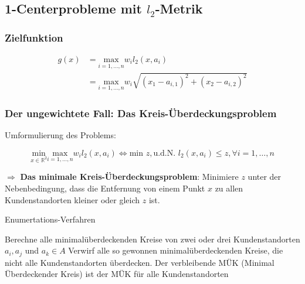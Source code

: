 
    \subsection{1-Centerprobleme mit $l_2$-Metrik} %
    \label{sub:1_centerprobleme_mit_l_2_metrik}

      \begin{exmp}
        {\color{blue}{Aufgabe 10}}
      \end{exmp}
      \subsubsection{Zielfunktion} %
      \label{ssub:zielfunktion}
        \begin{equation}
          \begin{aligned}
            g(x) &= \underset{i = 1,\dots, n}{\text{max}}w_il_2(x,a_i) \\
                 &= \underset{i = 1,\dots, n}{\text{max}}w_i\sqrt{(x_1 - a_{i, 1})^2 + (x_2 - a_{i,2})^2}
          \end{aligned}
        \end{equation}

      \subsubsection{Der ungewichtete Fall: Das Kreis-Überdeckungsproblem} %
      \label{ssub:der_ungewichtete_fall_das_kreis_überdeckungsproblem}
        \par Umformulierung des Problems:

        \[
          \underset{x \in \mathbb{R}^2}{\text{min}} \underset{i = 1,\dots, n}{\text{max}}w_il_2(x,a_i) \Leftrightarrow \text{min } z, \text{u.d.N. } l_2(x, a_i) \leq z, \forall i = 1, \dots, n
        \]

        \par $\Rightarrow$ \textbf{Das minimale Kreis-Überdeckungsproblem}: Minimiere $z$ unter der Nebenbedingung, dass die Entfernung von einem Punkt $x$ zu allen Kundenstandorten kleiner oder gleich $z$ ist.

        \begin{algorithm}[H]
          \begin{algorithmic}[1]
            \caption{Enumertations-Verfahren}
              \State Berechne alle minimalüberdeckenden Kreise von zwei oder drei Kundenstandorten $a_i, a_j$ und $a_k \in A$
              \State Verwirf alle so gewonnen minimalüberdeckenden Kreise, die nicht alle Kundenstandorten überdecken.
              \State Der verbleibende MÜK (Minimal Überdeckender Kreis) ist der MÜK für alle Kundenstandorten
            \end{algorithmic}
        \end{algorithm}

